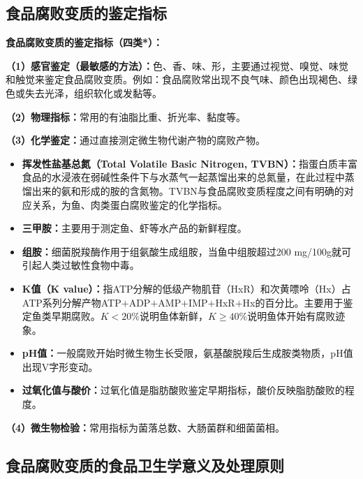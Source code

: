 \subsection{食品腐败变质的鉴定指标}

\begin{keybox}
\textbf{食品腐败变质的鉴定指标（四类*）：}

\textbf{（1）感官鉴定（最敏感的方法）：}色、香、味、形，主要通过视觉、嗅觉、味觉和触觉来鉴定食品腐败变质。例如：食品腐败常出现不良气味、颜色出现褐色、绿色或失去光泽，组织软化或发黏等。

\textbf{（2）物理指标：}常用的有油脂比重、折光率、黏度等。

\textbf{（3）化学鉴定：}通过直接测定微生物代谢产物的腐败产物。
\begin{itemize}[leftmargin=*]
    \item \textbf{挥发性盐基总氮（Total Volatile Basic Nitrogen, TVBN）：}指蛋白质丰富食品的水浸液在弱碱性条件下与水蒸气一起蒸馏出来的总氮量，在此过程中蒸馏出来的氨和形成的胺的含氮物。TVBN与食品腐败变质程度之间有明确的对应关系，为鱼、肉类蛋白腐败鉴定的化学指标。
    \item \textbf{三甲胺：}主要用于测定鱼、虾等水产品的新鲜程度。
    \item \textbf{组胺：}细菌脱羧酶作用于组氨酸生成组胺，当鱼中组胺超过200 mg/100g就可引起人类过敏性食物中毒。
    \item \textbf{K值（K value）：}指ATP分解的低级产物肌苷（HxR）和次黄嘌呤（Hx）占ATP系列分解产物ATP$+$ADP$+$AMP$+$IMP$+$HxR$+$Hx的百分比。主要用于鉴定鱼类早期腐败。$K < 20\%$说明鱼体新鲜，$K \geq 40\%$说明鱼体开始有腐败迹象。
    \item \textbf{pH值：}一般腐败开始时微生物生长受限，氨基酸脱羧后生成胺类物质，pH值出现V字形变动。
    \item \textbf{过氧化值与酸价：}过氧化值是脂肪酸败鉴定早期指标，酸价反映脂肪酸败的程度。
\end{itemize}

\textbf{（4）微生物检验：}常用指标为菌落总数、大肠菌群和细菌菌相。
\end{keybox}

\subsection{食品腐败变质的食品卫生学意义及处理原则}

